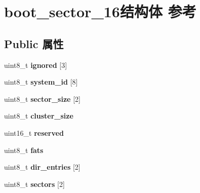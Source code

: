 \hypertarget{structboot__sector__16}{}\section{boot\+\_\+sector\+\_\+16结构体 参考}
\label{structboot__sector__16}
\subsection*{Public 属性}
\begin{DoxyCompactItemize}
\item 
\mbox{\label{structboot__sector__16_a94edfb74d7597e23de0f71795904f872}} 
uint8\+\_\+t {\bfseries ignored} \mbox{[}3\mbox{]}
\item 
\mbox{\label{structboot__sector__16_a07bd0ef8a9eb0901aca5c7441bb03ccc}} 
uint8\+\_\+t {\bfseries system\+\_\+id} \mbox{[}8\mbox{]}
\item 
\mbox{\label{structboot__sector__16_a30851042eec07bbba778e0f84885dc3d}} 
uint8\+\_\+t {\bfseries sector\+\_\+size} \mbox{[}2\mbox{]}
\item 
\mbox{\label{structboot__sector__16_aa45b54117b3ada0377ba0af8da130e30}} 
uint8\+\_\+t {\bfseries cluster\+\_\+size}
\item 
\mbox{\label{structboot__sector__16_aa668d100c9801f250cad274715519e4b}} 
uint16\+\_\+t {\bfseries reserved}
\item 
\mbox{\label{structboot__sector__16_a2b54dd064dcffd3562355ff364e1d381}} 
uint8\+\_\+t {\bfseries fats}
\item 
\mbox{\label{structboot__sector__16_aa89edcfb9e75a6eb48cad1e70f42a2dd}} 
uint8\+\_\+t {\bfseries dir\+\_\+entries} \mbox{[}2\mbox{]}
\item 
\mbox{\label{structboot__sector__16_a319a53f5023ae9a83b0442ccd1ae3bd7}} 
uint8\+\_\+t {\bfseries sectors} \mbox{[}2\mbox{]}
\item 
\mbox{\label{structboot__sector__16_a40053c4af13b08c92ee78be79b666733}} 

\end{DoxyCompactItemize}
